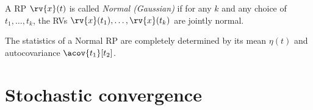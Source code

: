 \begin{mydefinition}
    A RP $\rv{x}(t)$ is called \emph{Normal (Gaussian)} if for any $k$ and any choice of $t_{1}, \ldots, t_{k}$, the RVs $\rv{x}(t_{1}), \ldots, \rv{x}(t_{k})$ are jointly normal. 
\end{mydefinition}
\begin{myremark}
    The statistics of a Normal RP are completely determined by its mean $\eta(t)$ and autocovariance $\acov{t_{1}}[t_{2}]$.
\end{myremark}


\section{Stochastic convergence}